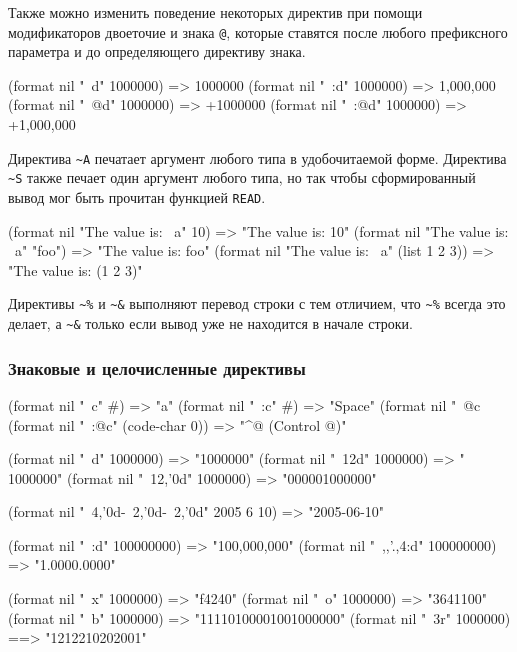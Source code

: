 Также  можно изменить поведение некоторых директив при помощи модификаторов двоеточие и знака \lstinline{@}, которые ставятся после любого префиксного параметра и до определяющего директиву знака.
\begin{cllst}{}{}
(format nil "~d" 1000000)   => 1000000
(format nil "~:d" 1000000)  => 1,000,000
(format nil "~@d" 1000000)  => +1000000
(format nil "~:@d" 1000000) => +1,000,000
\end{cllst}

Директива \lstinline{~A} печатает аргумент любого типа в удобочитаемой форме. Директива \lstinline{~S} также печает один аргумент любого типа, но так чтобы сформированный вывод мог быть прочитан функцией \lstinline{READ}.
\begin{cllst}{}{}
(format nil "The value is: ~a" 10)           => "The value is: 10"
(format nil "The value is: ~a" "foo")        => "The value is: foo"
(format nil "The value is: ~a" (list 1 2 3)) => "The value is: (1 2 3)"
\end{cllst}

Директивы \lstinline{~%} и \lstinline{~&} выполняют перевод строки с тем отличием, что \lstinline{~%} всегда это делает, а \lstinline{~&} только если вывод уже не находится в начале строки.

\subsubsection{Знаковые и целочисленные директивы}
\begin{cllst}{}{}
(format nil "~c" #\a)             => "a"
(format nil "~:c" #\Space)        => "Space"
(format nil "~@c~%
(format nil "~:@c" (code-char 0)) => "^@ (Control @)"

(format nil "~d" 1000000)      => "1000000"
(format nil "~12d" 1000000)    => "     1000000"
(format nil "~12,'0d" 1000000) => "000001000000"

(format nil "~4,'0d-~2,'0d-~2,'0d" 2005 6 10) => "2005-06-10"

(format nil "~:d" 100000000)       => "100,000,000"
(format nil "~,,'.,4:d" 100000000) => "1.0000.0000"

(format nil "~x" 1000000) => "f4240"
(format nil "~o" 1000000) => "3641100"
(format nil "~b" 1000000) => "11110100001001000000"
(format nil "~3r" 1000000) ==> "1212210202001"
\end{cllst}


